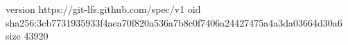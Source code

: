 version https://git-lfs.github.com/spec/v1
oid sha256:3cb7731935933f4aea70f820a536a7b8c0f7406a24427475a4a3da03664d30a6
size 43920
